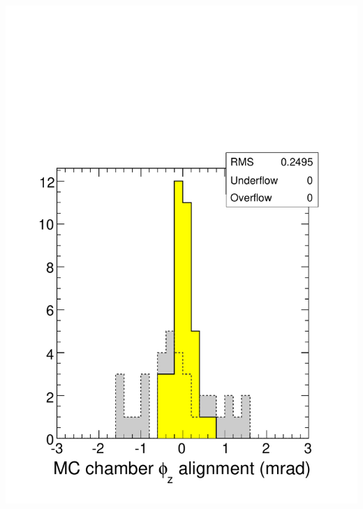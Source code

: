 \documentclass[compress]{beamer}
\begin{document}
\begin{frame}
\begin{columns}
\includegraphics[width=\linewidth]{mcchamber_phiz.pdf}
\end{columns}
\end{frame}
\end{document}

